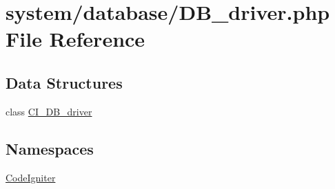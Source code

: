 \hypertarget{_d_b__driver_8php}{\section{system/database/\-D\-B\-\_\-driver.php File Reference}
\label{_d_b__driver_8php}
}
\subsection*{Data Structures}
\begin{DoxyCompactItemize}
\item 
class \hyperlink{class_c_i___d_b__driver}{C\-I\-\_\-\-D\-B\-\_\-driver}
\end{DoxyCompactItemize}
\subsection*{Namespaces}
\begin{DoxyCompactItemize}
\item 
\hyperlink{namespace_code_igniter}{Code\-Igniter}
\end{DoxyCompactItemize}
